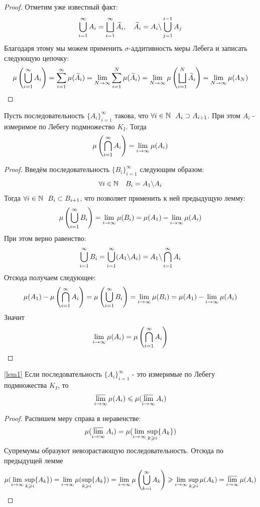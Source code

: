 \begin{proof}
	Отметим уже известный факт:
	\[
		\bigcup_{i = 1}^\infty A_i = \bscup_{i = 1}^\infty \wt{A}_i, \quad \wt{A}_i = A_i \bs \bigcup_{j = 1}^{i - 1} A_j
	\]
	Благодаря этому мы можем применить $\sigma$-аддитивность меры Лебега и записать следующую цепочку:
	\[
		\mu\left(\bigcup_{i = 1}^\infty A_i\right) = \sum_{i = 1}^\infty \mu(\wt{A}_i) = \liml_{N \to \infty} \sum_{i = 1}^N \mu(\wt{A}_i) = \liml_{N \to \infty} \mu\left(\bscup_{i = 1}^N \wt{A}_i\right) = \liml_{N \to \infty} \mu(A_N)
	\]
\end{proof}

\begin{lemma} \label{justLemma}
	Пусть последовательность $\{A_i\}_{i = 1}^\infty$ такова, что $\forall i \in \N\ \ A_i \supset A_{i + 1}$. При этом $A_i$ - измеримое по Лебегу подмножество $K_I$. Тогда
	\[
		\mu\left(\bigcap_{i = 1}^\infty A_i\right) = \liml_{i \to \infty} \mu(A_i)
	\]
\end{lemma}

\begin{proof}
	Введём последовательность $\{B_i\}_{i = 1}^\infty$ следующим образом:
	\[
		\forall i \in \N \quad B_i = A_1 \bs A_i
	\]
	Тогда $\forall i \in \N\ \ B_i \subset B_{i + 1}$, что позволяет применить к ней предыдущую лемму:
	\[
		\mu\left(\bigcup_{i = 1}^\infty B_i\right) = \liml_{i \to \infty} \mu(B_i) = \mu(A_1) - \liml_{i \to \infty} \mu(A_i)
	\]
	При этом верно равенство:
	\[
		\bigcup_{i = 1}^\infty B_i = \bigcup_{i = 1}^\infty (A_1 \bs A_i) = A_1 \bs \bigcap_{i = 1}^\infty A_i
	\]
	Отсюда получаем следующее:
	\[
		\mu(A_1) - \mu\left(\bigcap_{i = 1}^\infty A_i\right) = \mu\left(\bigcup_{i = 1}^\infty B_i\right) = \liml_{i \to \infty} \mu(B_i) = \mu(A_1) - \liml_{i \to \infty} \mu(A_i)
	\]
	Значит
	\[
	\liml_{i \to \infty} \mu(A_i) = \mu\left(\bigcap_{i = 1}^\infty A_i\right)
	\]
\end{proof}

\begin{lemma} \ref{lem1}
	Если последовательность $\{A_i\}_{i = 1}^\infty$ - это измеримые по Лебегу подмножества $K_I$, то
	\[
		\varlimsup_{i \to \infty} \mu(A_i) \le \mu(\varlimsup_{i \to \infty} A_i)
	\]
\end{lemma}

\begin{proof}
	Распишем меру справа в неравенстве:
	\[
		\mu(\varlimsup_{i \to \infty} A_i) = \mu(\liml_{i \to \infty} \sup_{k \ge i} \{A_k\})
	\]
	Супремумы образуют невозрастающую последовательность. Отсюда по предыдущей лемме
	\[
		\mu(\liml_{i \to \infty} \sup_{k \ge i} \{A_k\}) = \liml_{i \to \infty} \mu(\sup_{k \ge i} \{A_k\}) = \liml_{i \to \infty} \mu\left(\bigcup_{k = i}^\infty A_k\right) \ge \liml_{i \to \infty} \sup_{k \ge i} \mu(A_k) = 		\varlimsup_{i \to \infty} \mu(A_i)
	\]
\end{proof}

